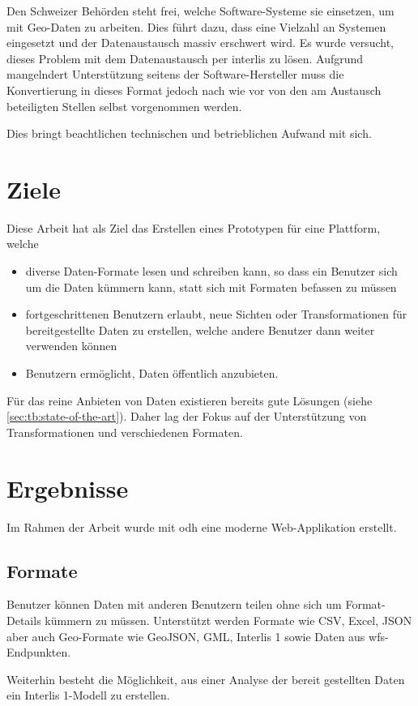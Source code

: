 Den Schweizer Behörden steht frei, welche Software-Systeme sie einsetzen, um mit Geo-Daten zu arbeiten. Dies führt dazu, dass eine Vielzahl an Systemen eingesetzt und der Datenaustausch massiv erschwert wird. Es wurde versucht, dieses Problem mit dem Datenaustausch per \gls{interlis} zu lösen. Aufgrund mangelndert Unterstützung seitens der Software-Hersteller muss die Konvertierung in dieses Format jedoch nach wie vor von den am Austausch beteiligten Stellen selbst vorgenommen werden.

Dies bringt beachtlichen technischen und betrieblichen Aufwand mit sich.

\section*{Ziele}

Diese Arbeit hat als Ziel das Erstellen eines Prototypen für eine Plattform, welche
\begin{itemize}
\item diverse Daten-Formate lesen und schreiben kann, so dass ein Benutzer sich um die Daten kümmern kann, statt sich mit Formaten befassen zu müssen
\item fortgeschrittenen Benutzern erlaubt, neue Sichten oder Transformationen für bereitgestellte Daten zu erstellen, welche andere Benutzer dann weiter verwenden können
\item Benutzern ermöglicht, Daten öffentlich anzubieten.
\end{itemize}

Für das reine Anbieten von Daten existieren bereits gute Lösungen (siehe \cref{sec:tb:state-of-the-art}). Daher lag der Fokus auf der Unterstützung von Transformationen und verschiedenen Formaten.

\section*{Ergebnisse}
Im Rahmen der Arbeit wurde mit \acf{odh} eine moderne Web-Applikation erstellt.

\subsection*{Formate}
Benutzer können Daten mit anderen Benutzern teilen ohne sich um Format-Details kümmern zu müssen. Unterstützt werden Formate wie CSV, Excel, JSON aber auch Geo-Formate wie GeoJSON, GML, Interlis 1 sowie Daten aus \gls{wfs}-Endpunkten.

Weiterhin besteht die Möglichkeit, aus einer Analyse der bereit gestellten Daten ein Interlis 1-Modell zu erstellen.

